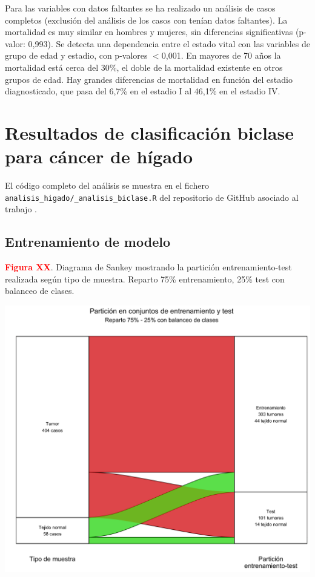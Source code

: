 Para las variables con datos faltantes se ha realizado un análisis de casos completos (exclusión del análisis de los casos con tenían datos faltantes).  La mortalidad es muy similar en hombres y mujeres, sin diferencias significativas (p-valor: 0,993). Se detecta una dependencia entre el estado vital con las variables de grupo de edad y estadio, con p-valores $<$0,001. En mayores de 70 años la mortalidad está cerca del 30\%, el doble de la mortalidad existente en otros grupos de edad. Hay grandes diferencias de mortalidad en función del estadio diagnosticado, que pasa del 6,7\% en el estadio I al 46,1\% en el estadio IV.

\section{Resultados de clasificación biclase para cáncer de hígado}

El código completo del análisis se muestra en el fichero \texttt{analisis\_higado/\_analisis\_biclase.R} del repositorio de GitHub asociado al trabajo \cite{Redondo-Sanchez2020}.\\

\subsection{Entrenamiento de modelo}

\newpage
\textbf{\textcolor{red}{Figura XX}}. Diagrama de Sankey mostrando la partición entrenamiento-test realizada según tipo de muestra. Reparto 75\% entrenamiento, 25\% test con balanceo de clases.
\begin{center}
	\includegraphics[width=1\textwidth]{figuras/higado_biclase_sankey.png} \\
\end{center}

